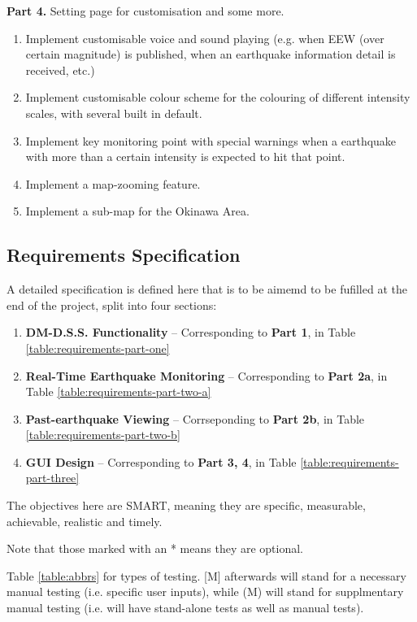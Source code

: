 \documentclass[10pt]{article}
\begin{document}
\textbf{Part 4.} Setting page for customisation and some more.
\begin{enumerate}
    \item Implement customisable voice and sound playing (e.g. when EEW (over certain magnitude) is published, when an earthquake information detail is received, etc.)
    \item Implement customisable colour scheme for the colouring of different intensity scales, with several built in default.
    \item Implement key monitoring point with special warnings when a earthquake with more than a certain intensity is expected to hit that point.
    \item Implement a map-zooming feature.
    \item Implement a sub-map for the Okinawa Area.
\end{enumerate}

\subsection{Requirements Specification}

A detailed specification is defined here that is to be aimemd to be fufilled at the end of the project, split into four sections:
\begin{enumerate}
    \item \textbf{DM-D.S.S. Functionality} -- Corresponding to \textbf{Part 1}, in Table \ref{table:requirements-part-one}
    \item \textbf{Real-Time Earthquake Monitoring} -- Corresponding to \textbf{Part 2a}, in Table \ref{table:requirements-part-two-a}
    \item \textbf{Past-earthquake Viewing} -- Corrseponding to \textbf{Part 2b}, in Table \ref{table:requirements-part-two-b}
    \item \textbf{GUI Design} -- Corresponding to \textbf{Part 3, 4}, in Table \ref{table:requirements-part-three}
\end{enumerate}

The objectives here are SMART, meaning they are specific, measurable, achievable, realistic and timely.

Note that those marked with an * means they are optional.

Table \ref{table:abbrs} for types of testing. [M] afterwards will stand for a necessary manual testing (i.e. specific user inputs), while (M) will stand for supplmentary manual testing (i.e. will have stand-alone tests as well as manual tests).
\end{document}
